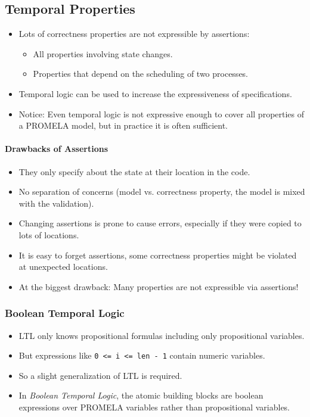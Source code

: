\documentclass[a4paper, 11pt, accentcolor = tud3b]{tudreport}
\newcommand{\inlinePromela}[1]{\lstinline[language = PROMELA]|#1|}
\begin{document}
			\subsection{Temporal Properties}
				\begin{itemize}
					\item Lots of correctness properties are not expressible by assertions:
						\begin{itemize}
							\item All properties involving state changes.
							\item Properties that depend on the scheduling of two processes.
						\end{itemize}
					\item Temporal logic can be used to increase the expressiveness of specifications.
					\item Notice: Even temporal logic is not expressive enough to cover all properties of a PROMELA model, but in practice it is often sufficient.
				\end{itemize}
			
				\paragraph{Drawbacks of Assertions}
					\begin{itemize}
						\item They only specify about the state at their location in the code.
						\item No separation of concerns (model vs. correctness property, the model is mixed with the validation).
						\item Changing assertions is prone to cause errors, especially if they were copied to lots of locations.
						\item It is easy to forget assertions, some correctness properties might be violated at unexpected locations.
						\item At the biggest drawback: Many properties are not expressible via assertions!
					\end{itemize}

				\subsubsection{Boolean Temporal Logic}
					\begin{itemize}
						\item LTL only knows propositional formulas including only propositional variables.
						\item But expressions like \inlinePromela{0 <= i <= len - 1} contain numeric variables.
						\item So a slight generalization of LTL is required.
						\item In \textit{Boolean Temporal Logic}, the atomic building blocks are boolean expressions over PROMELA variables rather than propositional variables.
					\end{itemize}
			
\end{document}
